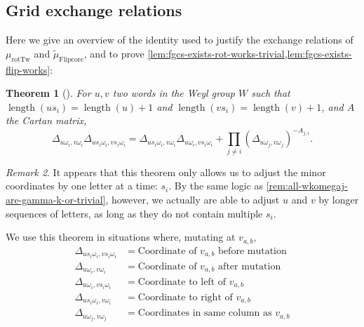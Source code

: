 \documentclass{amsart}
\theoremstyle{plain}
\newtheorem{theorem}{Theorem}[section]
\theoremstyle{definition}
\theoremstyle{remark}
\newtheorem{remark}[theorem]{Remark}
\newcommand{\fundamentalweight}{\omega}
\newcommand{\genminoryz}[3]{\Delta_{{#1} \fundamentalweight_{#3}, {#2}%
    \fundamentalweight_{#3}}}
\newcommand{\murottwist}{{\mu_{\text{rotTw}}}}
\newcommand{\muint}[1]{\widetilde{\mu}_{\text{#1}}}
\newcommand{\muflipcore}{\muint{Flipcore}}
\DeclareMathOperator{\length}{length}
\begin{document}
  \subsection{Grid exchange relations}

  \label{sec:thm-1.17}

  Here we give an overview of the identity
  \cite[Theorem~1.17]{fominzelevinsky1999} used to justify the exchange
  relations of $\murottwist$ and $\muflipcore$, and to prove
  \cref{lem:fgcs-exists-rot-works-trivial,lem:fgcs-exists-flip-works}:

  \begin{theorem}[{\cite[Theorem~1.17]{fominzelevinsky1999}}]
    \label{thm:local-1.17}
    For $u, v$ two words in the Weyl group $W$ such that $\length(u s_i)
    = \length(u) + 1$ and $\length(v s_i) = \length(v) + 1$, and $A$ the
    Cartan matrix, \[ \genminoryz{u}{v}{i} \genminoryz{u s_i}{v s_i}{i}
      = \genminoryz{u s_i}{v}{i} \genminoryz{u}{v s_i}{i} + \prod_{j \ne
        i} (\genminoryz{u}{v}{j})^{-A_{j,i}}. \]
  \end{theorem}

  \begin{remark}
    It appears that this theorem only allows us to adjust the minor
    coordinates by one letter at a time: $s_i$. By the same logic as
    \cref{rem:all-wkomegaj-are-gamma-k-or-trivial}, however, we actually
    are able to adjust $u$ and $v$ by longer sequences of letters, as
    long as they do not contain multiple $s_i$.
  \end{remark}

  We use this theorem in situations where, mutating at $v_{a,b}$,
  \begin{align*}
    \genminoryz{u s_i}{v s_i }{i} &= \text{Coordinate of $v_{a,b}$ before mutation} \\
    \genminoryz{u}{v}{i} &= \text{Coordinate of $v_{a,b}$ after mutation} \\
    \genminoryz{u }{v s_i}{i} &= \text{Coordinate to left of $v_{a,b}$} \\
    \genminoryz{u s_i}{v }{i} &= \text{Coordinate to right of $v_{a,b}$} \\
    \genminoryz{u }{v}{j} &= \text{Coordinates in same column as $v_{a,b}$}
  \end{align*}
\end{document}
